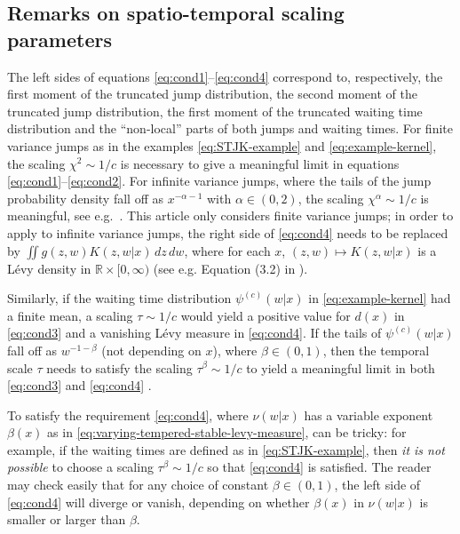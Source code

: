 \documentclass[a4paper,12pt]{elsarticle}
\numberwithin{equation}{section}
\theoremstyle{plain}
\theoremstyle{definition}
\theoremstyle{remark}
\numberwithin{equation}{section}
\newcommand{\spc}{\mathbb R}
\newcommand{\spctim}{\spc \times [0,\infty)}
\newcommand{\1}{\mathbf 1}
\begin{document}
\subsection{Remarks on spatio-temporal scaling parameters} \label{sec:scaling}
The left sides of equations \eqref{eq:cond1}--\eqref{eq:cond4} 
correspond to, respectively,  
the first moment of the truncated jump distribution, 
the second moment of the truncated jump distribution, 
the first moment of the truncated waiting time distribution 
and the ``non-local'' parts of both jumps and waiting times. 
For finite variance jumps as in the examples \eqref{eq:STJK-example}
and \eqref{eq:example-kernel}, 
the scaling $\chi^2 \sim 1/c$ is necessary to give a meaningful limit 
in equations \eqref{eq:cond1}--\eqref{eq:cond2}. 
For infinite variance jumps, where the tails of the jump probability 
density fall off as $x^{-\alpha-1}$ with $\alpha \in (0,2)$, 
the scaling $\chi^\alpha \sim 1/c$ is meaningful, see e.g.\ 
\cite[Section 3.8]{MeerschaertSikorskii}. 
This article only considers finite variance jumps; 
in order to apply to infinite variance jumps, the right side of \eqref{eq:cond4} 
needs to be replaced by 
$\iint g(z,w) K(z,w|x)\,dz\,dw$,
where for each $x$, $(z,w) \mapsto K(z,w|x)$ is a L\'evy density in 
$\spctim$ (see e.g. Equation (3.2) in \cite{BMMST}).

Similarly, if the waiting time distribution $\psi^{(c)}(w|x)$ in 
\eqref{eq:example-kernel} had a finite mean, a scaling 
$\tau \sim 1/c$ would yield a positive value for $d(x)$ in 
\eqref{eq:cond3} and a vanishing L\'evy measure in \eqref{eq:cond4}.
If the tails of $\psi^{(c)}(w|x)$ fall off as $w^{-1-\beta}$
(not depending on $x$), where 
$\beta \in (0,1)$, then the temporal scale $\tau$ needs to satisfy the 
scaling $\tau^\beta \sim 1/c$ to yield a meaningful limit in both 
\eqref{eq:cond3} and \eqref{eq:cond4} \cite[Section 3.7]{MeerschaertSikorskii}. 

To satisfy the requirement \eqref{eq:cond4}, where $\nu(w|x)$ has a variable
exponent $\beta(x)$ as in \eqref{eq:varying-tempered-stable-levy-measure},
can be tricky: for example, if the waiting times are defined as in 
\eqref{eq:STJK-example}, then \emph{it is not possible} to choose a scaling
$\tau^\beta \sim 1/c$ so that \eqref{eq:cond4} is satisfied. 
The reader may check easily that for any choice of constant 
$\beta \in (0,1)$, 
the left side of \eqref{eq:cond4} will diverge or vanish, depending 
on whether $\beta(x)$ in $\nu(w|x)$ is smaller or larger than $\beta$.
\end{document}
